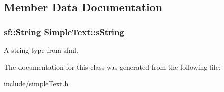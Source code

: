 \subsection{Member Data Documentation}
\subsubsection[{\texorpdfstring{s\+String}{sString}}]{\setlength{\rightskip}{0pt plus 5cm}sf\+::\+String Simple\+Text\+::s\+String\hspace{0.3cm}{\ttfamily [private]}}\hypertarget{class_simple_text_a0b9fdb31761f017d7ecd0a81d234f1b1}{}\label{class_simple_text_a0b9fdb31761f017d7ecd0a81d234f1b1}
A string type from sfml. 

The documentation for this class was generated from the following file\+:\begin{DoxyCompactItemize}
\item 
include/\hyperlink{simple_text_8h}{simple\+Text.\+h}\end{DoxyCompactItemize}
